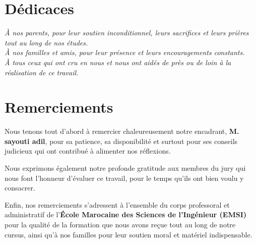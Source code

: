 \documentclass[12pt,a4paper]{report}
\begin{document}
\chapter*{Dédicaces}
\vspace{1cm}
\begin{center}
    \textit{À nos parents, pour leur soutien inconditionnel, leurs sacrifices et leurs prières tout au long de nos études.}\\
    \vspace{0.5cm}
    \textit{À nos familles et amis, pour leur présence et leurs encouragements constants.}\\
    \vspace{0.5cm}
    \textit{À tous ceux qui ont cru en nous et nous ont aidés de près ou de loin à la réalisation de ce travail.}
\end{center}
\clearpage

\chapter*{Remerciements}
\vspace{1cm}
Nous tenons tout d'abord à remercier chaleureusement notre encadrant, \textbf{M. sayouti adil}, pour sa patience, sa disponibilité et surtout pour ses conseils judicieux qui ont contribué à alimenter nos réflexions.

Nous exprimons également notre profonde gratitude aux membres du jury qui nous font l'honneur d'évaluer ce travail, pour le temps qu'ils ont bien voulu y consacrer.

Enfin, nos remerciements s'adressent à l'ensemble du corps professoral et administratif de l'\textbf{École Marocaine des Sciences de l'Ingénieur (EMSI)} pour la qualité de la formation que nous avons reçue tout au long de notre cursus, ainsi qu'à nos familles pour leur soutien moral et matériel indispensable.
\clearpage

\end{document}
